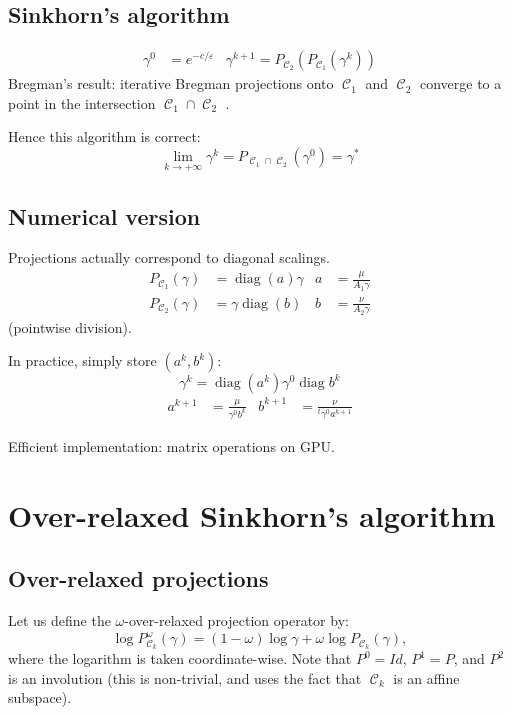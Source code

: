 \documentclass{article} %
\DeclareMathOperator{\Ccal}{\mathcal{C}}
\DeclareMathOperator{\diag}{diag}
\renewcommand{\epsilon}{\varepsilon}
\theoremstyle{plain}
\theoremstyle{definition}
\theoremstyle{remark}
\begin{document}
\subsection{Sinkhorn's algorithm}

\begin{align*}
\gamma^0 &= e^{-c/\epsilon} &
\gamma^{k+1} = P_{\Ccal_2}(P_{\Ccal_1}(\gamma^k))
\end{align*}
Bregman's result: iterative Bregman projections onto $\Ccal_1$ and $\Ccal_2$ converge to a point in the intersection $\Ccal_1 \cap \Ccal_2$ \cite{bregman67}.

Hence this algorithm is correct:
\[\lim_{k\rightarrow +\infty} \gamma^k = P_{\Ccal_1 \cap \Ccal_2}(\gamma^0) = \gamma^*\]


\subsection{Numerical version}

Projections actually correspond to diagonal scalings.
\begin{align*}
P_{\Ccal_1}(\gamma) &= \diag(a) \gamma &
a &=  \frac{\mu}{A_1 \gamma} \\
P_{\Ccal_2}(\gamma) &= \gamma \diag(b) &
b &= \frac{\nu}{A_2 \gamma}
\end{align*}
(pointwise division).

In practice, simply store $(a^k, b^k)$:
\[
\gamma^k = \diag(a^k) \gamma^0 \diag{b^k}
\]
\begin{align*}
a^{k+1} &= \frac{\mu}{\gamma^0 b^k} &
b^{k+1} &= \frac{\nu}{^t \gamma^0 a^{k+1}} 
\end{align*}

Efficient implementation: matrix operations on GPU.


\section{Over-relaxed Sinkhorn's algorithm}

\subsection{Over-relaxed projections}

Let us define the $\omega$-over-relaxed projection operator by:
\begin{equation}\label{eq:def_or_proj}
\log P^\omega_{\Ccal_k}(\gamma) = (1-\omega) \log \gamma + \omega \log P_{\Ccal_k}(\gamma),
\end{equation}
where the logarithm is taken coordinate-wise.
Note that $P^0 = Id$, $P^1 = P$, and $P^2$ is an involution (this is non-trivial, and uses the fact that $\Ccal_k$ is an affine subspace).
\end{document}

